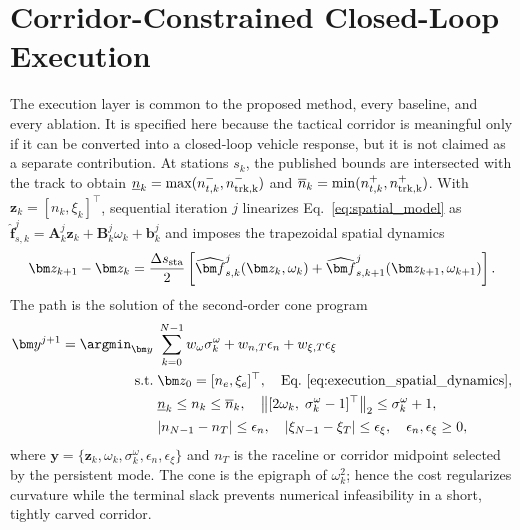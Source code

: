 \section{Corridor-Constrained Closed-Loop Execution}
\label{sec:execution}\label{sec:planner}\label{sec:controller}

The execution layer is common to the proposed method, every baseline, and
every ablation. It is specified here because the tactical corridor is meaningful
only if it can be converted into a closed-loop vehicle response, but it is not
claimed as a separate contribution. At stations $s_k$, the published bounds
are intersected with the track to obtain
$\underline n_k=\max(n^-_{t,k},n^-_{\rm trk,k})$ and
$\overline n_k=\min(n^+_{t,k},n^+_{\rm trk,k})$. With
$\bm z_k=[n_k,\xi_k]^\top$, sequential iteration $j$ linearizes
Eq.~\eqref{eq:spatial_model} as
$\widehat{\bm f}_{s,k}^{j}=\bm A_k^j\bm z_k+\bm B_k^j\omega_k+\bm b_k^j$
and imposes the trapezoidal spatial dynamics
\begin{equation}
\bm z_{k+1}-\bm z_k=\frac{\Delta s_{\rm sta}}{2}
\left[\widehat{\bm f}_{s,k}^{j}(\bm z_k,\omega_k)
+\widehat{\bm f}_{s,k+1}^{j}(\bm z_{k+1},\omega_{k+1})\right].
\label{eq:execution_spatial_dynamics}
\end{equation}
The path is the solution of the second-order cone program
\begin{equation}
\begin{aligned}
\bm y^{j+1}=\argmin_{\bm y}\;&
\sum_{k=0}^{N-1}w_\omega\sigma_k^\omega
+w_{n,T}\epsilon_n+w_{\xi,T}\epsilon_\xi\\
\mathrm{s.t.}\;&\bm z_0=[n_e,\xi_e]^\top,
\quad \text{Eq.~\eqref{eq:execution_spatial_dynamics}},\\
&\underline n_k\le n_k\le\overline n_k,\quad
\left\|[2\omega_k,\;\sigma_k^\omega-1]^\top\right\|_2
\le\sigma_k^\omega+1,\\
&|n_{N-1}-n_T|\le\epsilon_n,\quad
|\xi_{N-1}-\xi_T|\le\epsilon_\xi,\quad
\epsilon_n,\epsilon_\xi\ge0,
\end{aligned}
\label{eq:execution_socp}
\end{equation}
where $\bm y=\{\bm z_k,\omega_k,\sigma_k^\omega,\epsilon_n,
\epsilon_\xi\}$ and $n_T$ is the raceline or corridor midpoint selected by
the persistent mode. The cone is the epigraph of $\omega_k^2$; hence the cost
regularizes curvature while the terminal slack prevents numerical infeasibility
in a short, tightly carved corridor.

